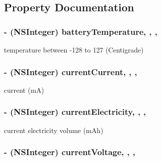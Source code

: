 \subsection{Property Documentation}
\hypertarget{interface_d_j_i_battery_a592f495cbb583ec4aa4a1323605f53b0}{
\subsubsection[{battery\+Temperature}]{\setlength{\rightskip}{0pt plus 5cm}-\/ (N\+S\+Integer) battery\+Temperature\hspace{0.3cm}{\ttfamily [read]}, {\ttfamily [write]}, {\ttfamily [nonatomic]}, {\ttfamily [assign]}}}\label{interface_d_j_i_battery_a592f495cbb583ec4aa4a1323605f53b0}
temperature between -\/128 to 127 (Centigrade) \hypertarget{interface_d_j_i_battery_a15cb9aa7a65f755d4822a1bbfd095496}{
\subsubsection[{current\+Current}]{\setlength{\rightskip}{0pt plus 5cm}-\/ (N\+S\+Integer) current\+Current\hspace{0.3cm}{\ttfamily [read]}, {\ttfamily [write]}, {\ttfamily [nonatomic]}, {\ttfamily [assign]}}}\label{interface_d_j_i_battery_a15cb9aa7a65f755d4822a1bbfd095496}
current (m\+A) \hypertarget{interface_d_j_i_battery_a9e00083e9a8276841941d13878dd0280}{
\subsubsection[{current\+Electricity}]{\setlength{\rightskip}{0pt plus 5cm}-\/ (N\+S\+Integer) current\+Electricity\hspace{0.3cm}{\ttfamily [read]}, {\ttfamily [write]}, {\ttfamily [nonatomic]}, {\ttfamily [assign]}}}\label{interface_d_j_i_battery_a9e00083e9a8276841941d13878dd0280}
current electricity volume (m\+Ah) \hypertarget{interface_d_j_i_battery_a2cdaf2d785248e9ce20908bed4fbd2a9}{
\subsubsection[{current\+Voltage}]{\setlength{\rightskip}{0pt plus 5cm}-\/ (N\+S\+Integer) current\+Voltage\hspace{0.3cm}{\ttfamily [read]}, {\ttfamily [write]}, {\ttfamily [nonatomic]}, {\ttfamily [assign]}}}\label{interface_d_j_i_battery_a2cdaf2d785248e9ce20908bed4fbd2a9}
